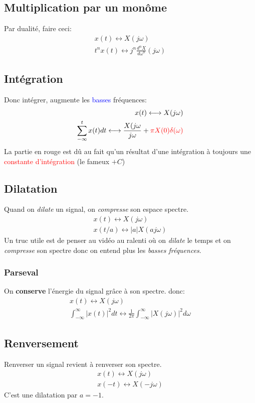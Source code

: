 \documentclass{report}
\begin{document}
\subsection{Multiplication par un monôme}
Par dualité, faire ceci:
\begin{align*}
x(t) \longleftrightarrow X(j\omega)\\
t^nx(t) \longleftrightarrow j^n \frac{d^nX}{d\omega^n} (j\omega)
\end{align*}
\subsection{Intégration}
Donc intégrer, augmente les \textcolor{blue}{basses} fréquences:
\begin{align*}
x(t) \longleftrightarrow X(j\omega)\\
\sum_{-\infty}^t	x(t)dt \longleftrightarrow \frac{X(j\omega}{j\omega} + \textcolor{red}{\pi X(0) \delta(\omega)}
\end{align*}
La partie en rouge est dû au fait qu'un résultat d'une intégration à toujours une \textcolor{red}{constante d'intégration} (le fameux $+C$)

\subsection{Dilatation}
Quand on \textit{dilate} un signal, on \textit{compresse} son espace spectre.
\begin{align*}
x(t) \longleftrightarrow X(j\omega)\\
x(t/a) \longleftrightarrow |a|X(aj\omega)
\end{align*}
Un truc utile est de penser au vidéo au ralenti où on \textit{dilate} le temps et on \textit{compresse} son spectre donc on entend plus les \textit{basses fréquences}.

\subsubsection{Parseval}
On \textbf{conserve} l'énergie du signal grâce à son spectre. donc:
\begin{align*}
x(t) \longleftrightarrow X(j\omega)\\
\int_{-\infty}^{\infty} |x(t)|^2 dt \longleftrightarrow \frac{1}{2\pi} \int_{-\infty}^{\infty} |X(j\omega)|^2 d\omega
\end{align*}

\subsection{Renversement}
Renverser un signal revient à renverser son spectre.
\begin{align}
x(t) \longleftrightarrow X(j\omega)\\
x(-t) \longleftrightarrow X(-j\omega)
\end{align}
C'est une dilatation par $a = -1$.
\end{document}
